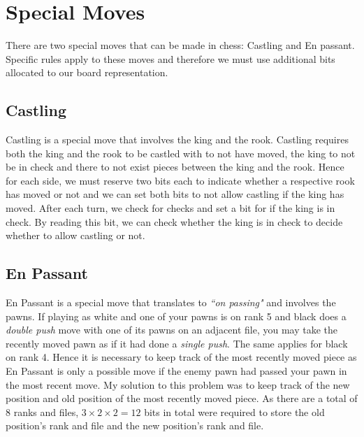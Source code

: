 \section{Special Moves}
There are two special moves that can be made in chess: Castling and En passant. Specific rules apply to these moves and therefore we must use additional bits allocated to our board representation.
\subsection{Castling}
Castling is a special move that involves the king and the rook. Castling requires both the king and the rook to be castled with to not have moved, the king to not be in check and there to not exist pieces between the king and the rook. Hence for each side, we must reserve two bits each to indicate whether a respective rook has moved or not and we can set both bits to not allow castling if the king has moved. After each turn, we check for checks and set a bit for if the king is in check. By reading this bit, we can check whether the king is in check to decide whether to allow castling or not.
\subsection{En Passant}
En Passant is a special move that translates to \textit{``on passing"} and involves the pawns. If playing as white and one of your pawns is on rank 5 and black does a \textit{double push} move with one of its pawns on an adjacent file, you may take the recently moved pawn as if it had done a \textit{single push}. The same applies for black on rank 4. Hence it is necessary to keep track of the most recently moved piece as En Passant is only a possible move if the enemy pawn had passed your pawn in the most recent move. My solution to this problem was to keep track of the new position and old position of the most recently moved piece. As there are a total of 8 ranks and files, $3\times 2\times 2 = 12$ bits in total were required to store the old position's rank and file and the new position's rank and file.
